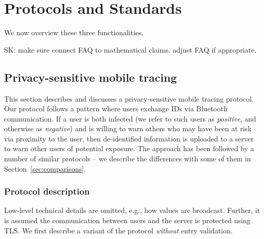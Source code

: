 \documentclass{article}
\newcommand{\sk}[1]{\textsf{\color{magenta} SK: #1}}
\begin{document}
\section{Protocols and Standards} 
We now overview these three functionalities.

\sk{make sure connect FAQ to mathematical claims. adjust FAQ if appropriate.}

\subsection{Privacy-sensitive mobile tracing} \label{sect:Bluetooth}

This section describes and discusses a privacy-sensitive mobile tracing protocol. Our protocol follows a pattern where users exchange IDs via Bluetooth communication.   If a user is both infected (we refer to such users as {\em positive}, and otherwise as {\em negative}) and is willing to warn others who may have been at risk via proximity to the user, then de-identified information is uploaded to a server to warn other users of potential exposure. The approach has been followed by a number of similar protocols -- we describe the differences with some of them in Section~\ref{sec:comparisons}.


\subsubsection{Protocol description} 

Low-level technical details are omitted, e.g., how values are broadcast. Further, it is assumed the communication between users and the server is protected using TLS. We first describe a variant of the protocol {\em without} entry validation. 


\newcommand{\id}{\mathrm{id}}
\newcommand{\dt}{\mathrm{dt}}
\end{document}
